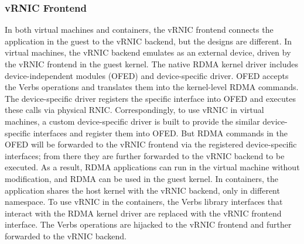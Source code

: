 \subsubsection{vRNIC Frontend}

In both virtual machines and containers, the vRNIC frontend connects the application in the guest to the vRNIC backend, but the designs are different. 
In virtual machines, the vRNIC backend emulates as an external device, driven by the vRNIC frontend in the guest kernel. The native RDMA kernel driver includes device-independent modules (OFED) and device-specific driver. OFED accepts the Verbs operations and translates them into the kernel-level RDMA commands. The device-specific driver registers the specific interface into OFED and executes these calls via physical RNIC. Correspondingly, to use vRNIC in virtual machines, a custom device-specific driver is built to provide the similar device-specific interfaces and register them into OFED. But RDMA commands in the OFED will be forwarded to the vRNIC frontend via the registered device-specific interfaces; from there
they are further forwarded to the vRNIC backend to be executed. As a result, RDMA applications can run in the virtual machine without modification, and RDMA can be used in the guest kernel. 
In containers, the application shares the host kernel with the vRNIC backend, only in different namespace. To use vRNIC in the containers, the Verbs library interfaces that interact with the RDMA kernel driver are replaced with the vRNIC frontend interface. The Verbs operations are hijacked to the vRNIC frontend and further forwarded to the vRNIC backend.

